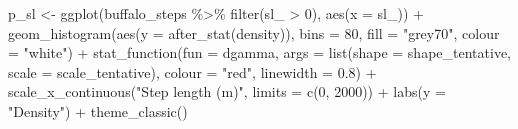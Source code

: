 \documentclass[
  letterpaper,
  DIV=11,
  numbers=noendperiod]{scrartcl}
\newenvironment{Shaded}{\begin{snugshade}}{\end{snugshade}}
\newcommand{\AttributeTok}[1]{\textcolor[rgb]{0.40,0.45,0.13}{#1}}
\newcommand{\DecValTok}[1]{\textcolor[rgb]{0.68,0.00,0.00}{#1}}
\newcommand{\FloatTok}[1]{\textcolor[rgb]{0.68,0.00,0.00}{#1}}
\newcommand{\FunctionTok}[1]{\textcolor[rgb]{0.28,0.35,0.67}{#1}}
\newcommand{\NormalTok}[1]{\textcolor[rgb]{0.00,0.23,0.31}{#1}}
\newcommand{\OtherTok}[1]{\textcolor[rgb]{0.00,0.23,0.31}{#1}}
\newcommand{\SpecialCharTok}[1]{\textcolor[rgb]{0.37,0.37,0.37}{#1}}
\newcommand{\StringTok}[1]{\textcolor[rgb]{0.13,0.47,0.30}{#1}}
\begin{document}
\begin{Shaded}
\begin{Highlighting}[]
\NormalTok{p\_sl }\OtherTok{\textless{}{-}} \FunctionTok{ggplot}\NormalTok{(buffalo\_steps }\SpecialCharTok{\%\textgreater{}\%} \FunctionTok{filter}\NormalTok{(sl\_ }\SpecialCharTok{\textgreater{}} \DecValTok{0}\NormalTok{), }\FunctionTok{aes}\NormalTok{(}\AttributeTok{x =}\NormalTok{ sl\_)) }\SpecialCharTok{+}
  \FunctionTok{geom\_histogram}\NormalTok{(}\FunctionTok{aes}\NormalTok{(}\AttributeTok{y =} \FunctionTok{after\_stat}\NormalTok{(density)), }\AttributeTok{bins =} \DecValTok{80}\NormalTok{,}
                 \AttributeTok{fill =} \StringTok{"grey70"}\NormalTok{, }\AttributeTok{colour =} \StringTok{"white"}\NormalTok{) }\SpecialCharTok{+}
  \FunctionTok{stat\_function}\NormalTok{(}\AttributeTok{fun =}\NormalTok{ dgamma,}
                \AttributeTok{args =} \FunctionTok{list}\NormalTok{(}\AttributeTok{shape =}\NormalTok{ shape\_tentative, }\AttributeTok{scale =}\NormalTok{ scale\_tentative),}
                \AttributeTok{colour =} \StringTok{"red"}\NormalTok{, }\AttributeTok{linewidth =} \FloatTok{0.8}\NormalTok{) }\SpecialCharTok{+}
  \FunctionTok{scale\_x\_continuous}\NormalTok{(}\StringTok{"Step length (m)"}\NormalTok{, }\AttributeTok{limits =} \FunctionTok{c}\NormalTok{(}\DecValTok{0}\NormalTok{, }\DecValTok{2000}\NormalTok{)) }\SpecialCharTok{+}
  \FunctionTok{labs}\NormalTok{(}\AttributeTok{y =} \StringTok{"Density"}\NormalTok{) }\SpecialCharTok{+}
  \FunctionTok{theme\_classic}\NormalTok{()}


\end{Highlighting}
\end{Shaded}
\end{document}
